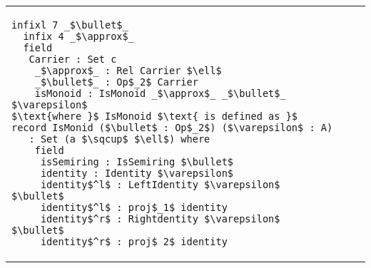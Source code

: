 \begin{adjustbox}{width=1.2\columnwidth,center}
\begin{tabular}{p{7cm} p{7cm} p{7cm}}
\begin{lstlisting}[mathescape]
  infixl 7 _$\bullet$_
  infix 4 _$\approx$_
  field 
   Carrier : Set c 
    _$\approx$_ : Rel Carrier $\ell$ 
    _$\bullet$_ : Op$_2$ Carrier 
    isMonoid : IsMonoid _$\approx$_ _$\bullet$_ $\varepsilon$ 
$\text{where }$ IsMonoid $\text{ is defined as }$
record IsMonid ($\bullet$ : Op$_2$) ($\varepsilon$ : A) 
   : Set (a $\sqcup$ $\ell$) where 
    field 
     isSemiring : IsSemiring $\bullet$ 
     identity : Identity $\varepsilon$ 
     identity$^l$ : LeftIdentity $\varepsilon$ $\bullet$ 
     identity$^l$ : proj$_1$ identity 
     identity$^r$ : Rightdentity $\varepsilon$ $\bullet$ 
     identity$^r$ : proj$_2$ identity           
\end{lstlisting}    
\end{tabular}  
\end{adjustbox}
